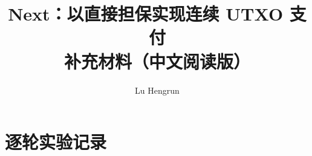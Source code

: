 \documentclass[letterpaper,11pt,onecolumn,journal]{IEEEtran}
\title{Next：以直接担保实现连续 UTXO 支付\\补充材料（中文阅读版）}
\author{Lu Hengrun}
\begin{document}
\maketitle






\clearpage
\section{逐轮实验记录}



\end{document}
